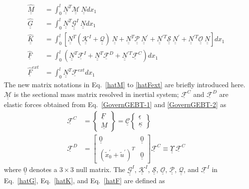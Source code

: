 \documentclass{aiaa-tc}
\newcommand{\tens}[1]{\underline{\underline{#1}}}
\renewcommand{\vec}[1]{\underline{#1}}
\begin{document}
\begin{align}
	\label{hatM} 
	\hat{\tens{M}}&= \int_0^l \underline{\underline{N}}^T \mathcal{\underline{\underline{M}}} ~\underline{\underline{N}} dx_1 \\
	\label{hatG}
	\hat{\tens{G}} &= \int_0^l \tens{N}^T \tens{\mathcal{G}}^I~\tens{N} dx_1\\ 
	\label{hatK}
	\hat{\tens{K}}&=\int_0^l \left[ \tens{N}^T (\tens{\mathcal{K}}^I + \mathcal{\tens{Q}})~ \tens{N} + \tens{N}^T \mathcal{\tens{P}}~ \tens{N}^\prime + \tens{N}^{\prime T} \mathcal{\tens{S}}~ \tens{N}^\prime + \tens{N}^{\prime T} \mathcal{\tens{O}}~ \tens{N} \right] d x_1 \\	
	\label{hatF}
	\hat{\vec{F}} &= \int_0^l (\tens{N}^T \vec{\mathcal{F}}^I + \tens{N}^T \mathcal{\vec{F}}^D + \tens{N}^{\prime T} \mathcal{\vec{F}}^C)dx_1 \\
	\label{hatFext}
	\hat{\vec{F}}^{ext}& = \int_0^l \tens{N}^T \mathcal{\vec{F}}^{ext} dx_1 
\end{align}
The new matrix notations in Eq.~\eqref{hatM} to \eqref{hatFext} are briefly
introduced here. $\mathcal{\tens{M}}$ is the sectional mass matrix resolved
in inertial system; $\mathcal{\vec{F}}^C$ and $\mathcal{\vec{F}}^D$ are
elastic forces obtained from Eq.~\eqref{GovernGEBT-1} and
\eqref{GovernGEBT-2} as
\begin{align}
	\label{FC}
	\mathcal{\vec{F}}^C &= \begin{Bmatrix}
         \vec{F} \\
	\vec{M}
	\end{Bmatrix} = \tens{\mathcal{C}} \begin{Bmatrix}
	\vec{\epsilon} \\
	\vec{\kappa}
	\end{Bmatrix} \\
	\label{FD}
	\mathcal{\vec{F}}^D & = \begin{bmatrix}
	\underline{\underline{0}} & \underline{\underline{0}}\\
	(\tilde{x}_0^\prime+\tilde{u}^\prime)^T & \underline{\underline{0}}
	\end{bmatrix}
	\mathcal{\vec{F}}^C \equiv \tens{\Upsilon}~ \mathcal{\vec{F}}^C
\end{align}
where $\underline{\underline{0}}$ denotes a $3 \times 3$ null matrix. The $\tens{\mathcal{G}}^I$, $\tens{\mathcal{K}}^I$, $\mathcal{\tens{S}}$, $\mathcal{\tens{O}}$, $\mathcal{\tens{P}}$, $\mathcal{\tens{Q}}$, and $\vec{\mathcal{F}}^I$ in Eq.~\eqref{hatG}, Eq.~\eqref{hatK}, and Eq.~\eqref{hatF} are defined as
\end{document}
